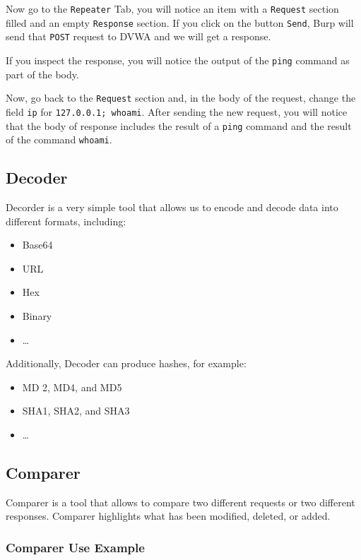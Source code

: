 \documentclass[twocolumn]{article}
\begin{document}
Now go to the \texttt{Repeater} Tab, you will notice an item with a \texttt{Request} section filled and an empty \texttt{Response} section. If you click on the button \texttt{Send}, Burp will send that \texttt{POST} request to DVWA and we will get a response.

If you inspect the response, you will notice the output of the \texttt{ping} command as part of the body.

Now, go back to the \texttt{Request} section and, in the body of the request, change the field \texttt{ip} for \texttt{127.0.0.1; whoami}. After sending the new request, you will notice that the body of response includes the result of a \texttt{ping} command and the result of the command \texttt{whoami}.

\subsection{Decoder}

Decorder is a very simple tool that allows us to encode and decode data into different formats, including:

\begin{itemize}
    \item Base64
    \item URL 
    \item Hex
    \item Binary
    \item \dots
\end{itemize}

Additionally, Decoder can produce hashes, for example:

\begin{itemize}
    \item MD 2, MD4, and MD5
    \item SHA1, SHA2, and SHA3
    \item \dots
\end{itemize}

\subsection{Comparer}

Comparer is a tool that allows to compare two different requests or two different responses. Comparer highlights what has been modified, deleted, or added.

\subsubsection{Comparer Use Example}
\end{document}
